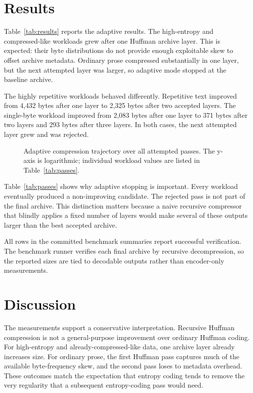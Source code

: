 \documentclass[conference]{IEEEtran}
\begin{document}
\section{Results}



Table~\ref{tab:results} reports the adaptive results. The high-entropy and compressed-like workloads grew after one Huffman archive layer. This is expected: their byte distributions do not provide enough exploitable skew to offset archive metadata. Ordinary prose compressed substantially in one layer, but the next attempted layer was larger, so adaptive mode stopped at the baseline archive.

The highly repetitive workloads behaved differently. Repetitive text improved from 4,432 bytes after one layer to 2,325 bytes after two accepted layers. The single-byte workload improved from 2,083 bytes after one layer to 371 bytes after two layers and 293 bytes after three layers. In both cases, the next attempted layer grew and was rejected.



\begin{figure}[t]
\centering

\caption{Adaptive compression trajectory over all attempted passes. The y-axis is logarithmic; individual workload values are listed in Table~\ref{tab:passes}.}
\label{fig:trajectory}
\end{figure}

Table~\ref{tab:passes} shows why adaptive stopping is important. Every workload eventually produced a non-improving candidate. The rejected pass is not part of the final archive. This distinction matters because a naive recursive compressor that blindly applies a fixed number of layers would make several of these outputs larger than the best accepted archive.

All rows in the committed benchmark summaries report successful verification. The benchmark runner verifies each final archive by recursive decompression, so the reported sizes are tied to decodable outputs rather than encoder-only measurements.

\section{Discussion}

The measurements support a conservative interpretation. Recursive Huffman compression is not a general-purpose improvement over ordinary Huffman coding. For high-entropy and already-compressed-like data, one archive layer already increases size. For ordinary prose, the first Huffman pass captures much of the available byte-frequency skew, and the second pass loses to metadata overhead. These outcomes match the expectation that entropy coding tends to remove the very regularity that a subsequent entropy-coding pass would need.
\end{document}
